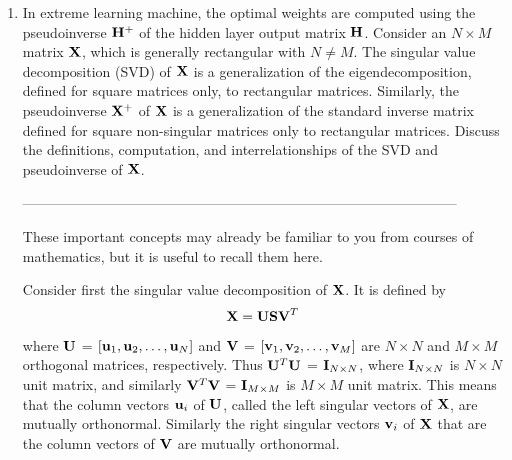 \documentclass[10pt]{article}
\begin{document}
\begin{enumerate}
\vspace{2cm}

\item In extreme learning machine, the optimal weights are computed using the
pseudoinverse ${\bf H}^+$ of the hidden layer output matrix ${\bf H}$. Consider
an $N \times M$ matrix ${\bf X}$, which is generally rectangular with $N \neq M$.
The singular value decomposition (SVD) of ${\bf X}$ is a generalization of the
eigendecomposition, defined for square matrices only, to rectangular matrices.
Similarly, the pseudoinverse ${\bf X}^+$ of ${\bf X}$ is a generalization of the
standard inverse matrix defined for square non-singular matrices only to
rectangular matrices. Discuss the definitions, computation, and interrelationships
of the SVD and pseudoinverse of ${\bf X}$.

---------------------------------------------------------------------------------------------

These important concepts may already be familiar to you from courses of mathematics,
but it is useful to recall them here.

Consider first the singular value decomposition of ${\bf X}$. It is defined by
%
\begin{equation}
{\bf X} = {\bf USV}^T
\label{eq:SVD}
\end{equation}
%
where ${\bf U}$ = $[{\bf u}_1,{\bf u}_2,\ldots,{\bf u}_N]$ and ${\bf V}$ =
$[{\bf v}_1,{\bf v}_2,\ldots,{\bf v}_M]$ are $N \times N$ and $M \times M$
orthogonal matrices, respectively. Thus ${\bf U}^T{\bf U}$ = ${\bf I}_{N \times N}$,
where ${\bf I}_{N \times N}$ is $N \times N$ unit matrix, and similarly
${\bf V}^T{\bf V}$ = ${\bf I}_{M \times M}$ is $M \times M$ unit matrix. This means
that the column vectors ${\bf u}_i$ of ${\bf U}$, called the left singular vectors
of ${\bf X}$, are mutually orthonormal. Similarly the right singular vectors
${\bf v}_i$ of ${\bf X}$ that are the column vectors of ${\bf V}$ are mutually
orthonormal.


\end{enumerate}
\end{document}
